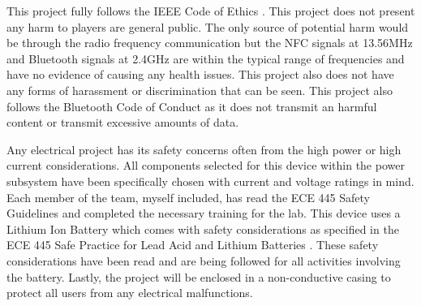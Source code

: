 \documentclass[12pt]{article}
\begin{document}
This project fully follows the IEEE Code of Ethics \cite{IEEE_ethics}. This project does not present any harm to players are general public. The only source of potential harm would be through the radio frequency communication but the NFC signals at 13.56MHz and Bluetooth signals at 2.4GHz are within the typical range of frequencies and have no evidence of causing any health issues. This project also does not have any forms of harassment or discrimination that can be seen. This project also follows the Bluetooth Code of Conduct \cite{BT_conduct} as it does not transmit an harmful content or transmit excessive amounts of data.

Any electrical project has its safety concerns often from the high power or high current considerations. All components selected for this device within the power subsystem have been specifically chosen with current and voltage ratings in mind. Each member of the team, myself included, has read the ECE 445 Safety Guidelines \cite{445_safety} and completed the necessary training for the lab. This device uses a Lithium Ion Battery which comes with safety considerations as specified in the ECE 445 Safe Practice for Lead Acid and Lithium Batteries \cite{Li_safety}. These safety considerations have been read and are being followed for all activities involving the battery. Lastly, the project will be enclosed in a non-conductive casing to protect all users from any electrical malfunctions.



\end{document}
